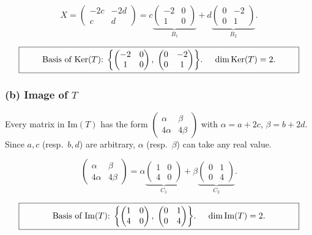 \documentclass[a4paper,12pt]{article}
\begin{document}
\[
X = \begin{pmatrix} -2c & -2d \\ c & d \end{pmatrix}
= c \underbrace{\begin{pmatrix} -2 & 0 \\ 1 & 0 \end{pmatrix}}_{B_1}
+ d \underbrace{\begin{pmatrix} 0 & -2 \\ 0 & 1 \end{pmatrix}}_{B_2}.
\]

\[
\fbox{\parbox{0.93\textwidth}{\centering
Basis of $\text{Ker}(T)$: $\left\{\begin{pmatrix} -2 & 0 \\ 1 & 0 \end{pmatrix},\; \begin{pmatrix} 0 & -2 \\ 0 & 1 \end{pmatrix}\right\}$. \quad $\dim \text{Ker}(T) = 2$.
}}
\]

\subsubsection*{(b) Image of $T$}

Every matrix in $\text{Im}(T)$ has the form $\begin{pmatrix} \alpha & \beta \\ 4\alpha & 4\beta \end{pmatrix}$ with $\alpha = a + 2c$, $\beta = b + 2d$. Since $a, c$ (resp.\ $b, d$) are arbitrary, $\alpha$ (resp.\ $\beta$) can take any real value.

\[
\begin{pmatrix} \alpha & \beta \\ 4\alpha & 4\beta \end{pmatrix}
= \alpha \underbrace{\begin{pmatrix} 1 & 0 \\ 4 & 0 \end{pmatrix}}_{C_1}
+ \beta \underbrace{\begin{pmatrix} 0 & 1 \\ 0 & 4 \end{pmatrix}}_{C_2}.
\]

\[
\fbox{\parbox{0.93\textwidth}{\centering
Basis of $\text{Im}(T)$: $\left\{\begin{pmatrix} 1 & 0 \\ 4 & 0 \end{pmatrix},\; \begin{pmatrix} 0 & 1 \\ 0 & 4 \end{pmatrix}\right\}$. \quad $\dim \text{Im}(T) = 2$.
}}
\]
\end{document}
